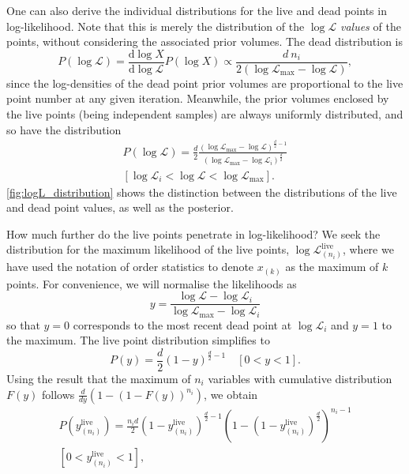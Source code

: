 \documentclass[usenatbib]{mnras}
\newcommand{\Like}{\mathcal{L}}
\newcommand{\logLmax}{\log \Like_\mathrm{max}}
\begin{document}
One can also derive the individual distributions for the live and dead points in log-likelihood. Note that this is merely the distribution of the $\log \Like$ \textit{values} of the points, without considering the associated prior volumes. The dead distribution is
\begin{equation}
    P(\log\Like) = \frac{\mathrm{d} \log X}{\mathrm{d} \log\Like} P(\log X) \propto \frac{d\:n_i}{2(\logLmax - \log\Like)},
\end{equation}
since the log-densities of the dead point prior volumes are proportional to the live point number at any given iteration. Meanwhile, the prior volumes enclosed by the live points (being independent samples) are always uniformly distributed, and so have the distribution 
\begin{multline}
	P(\log\mathcal{L}) = \frac{d}{2}\frac{(\log\mathcal{L}_\mathrm{max}-\log\mathcal{L})^{\frac{d}{2}-1}}{(\log\mathcal{L}_\mathrm{max}-\log\mathcal{L}_i)^{\frac{d}{2}}} \\
    [\log\mathcal{L}_i < \log\mathcal{L} <\log\mathcal{L}_\mathrm{max}].
    \label{eq:PL}
\end{multline}
\cref{fig:logL_distribution} shows the distinction between the distributions of the live and dead point values, as well as the posterior. 
\par
How much further do the live points penetrate in log-likelihood? We seek the distribution for the maximum likelihood of the live points, $\log\Like_{(n_i)}^{\mathrm{live}}$, where we have used the notation of order statistics to denote $x_{(k)}$ as the maximum of $k$ points.  For convenience, we will normalise the likelihoods as
\begin{equation}
    y = \frac{\log\mathcal{L}-\log\mathcal{L}_i}{\log\mathcal{L}_\mathrm{max}-\log\mathcal{L}_i}
    \label{eq:normalised_likelihood}
\end{equation}
so that $y=0$ corresponds to the most recent dead point at $\log\Like_i$ and $y=1$ to the maximum. The live point distribution simplifies to
\begin{equation}
    P(y) = \frac{d}{2}(1-y)^{\frac{d}{2}-1} \quad [0<y<1].
    \label{eq:Py}
\end{equation}
Using the result that the maximum of $n_i$ variables with cumulative distribution $F(y)$ follows $\frac{d}{dy}( 1- (1-F(y))^{n_i})$, we obtain
\begin{multline}
    P(y_{(n_i)}^\mathrm{live}) = \frac{n_i d}{2}(1-y_{(n_i)}^\mathrm{live})^{\frac{d}{2}-1}\left(1-(1-y_{(n_i)}^\mathrm{live})^{\frac{d}{2}}\right)^{n_i-1}\\ 
    [0<y_{(n_i)}^\mathrm{live}<1],
    \label{eq:Pyhat}
\end{multline}
\end{document}
